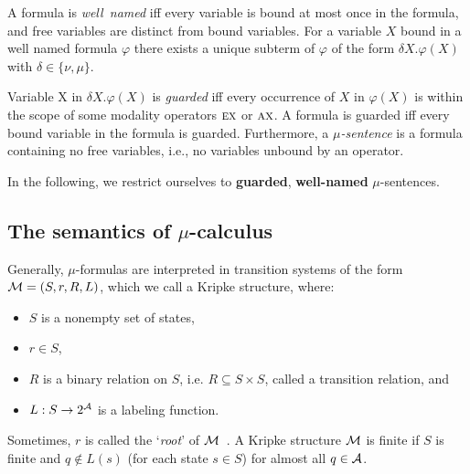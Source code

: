 \documentclass[runningheads]{llncs}
\begin{document}
A formula is \emph{well\ named} iff every variable is bound at most once in the formula, and free variables are distinct from bound
variables. For a variable $X$ bound in a well named formula $\varphi$ there exists a unique subterm of $\varphi$ of the form $\delta X. \varphi(X)$ with $\delta \in \{\nu, \mu\}$.

Variable X in $\delta X. \varphi(X)$ is \emph{guarded} iff every occurrence of $X$ in
$\varphi(X)$ is within the scope of some modality operators $\textsc{e} \textsc{x}$ or $\textsc{a} \textsc{x}$.
A formula is guarded iff every bound variable in the formula is guarded. Furthermore, a \emph{$\mu$-sentence} is a formula containing no free
variables, i.e., no variables unbound by an operator.

In the following, we restrict ourselves to \textbf{guarded}, \textbf{well-named} $\mu$-sentences.


\subsection{The semantics of $\mu$-calculus}\label{mu-semantic}
Generally, $\mu$-formulas are interpreted in transition systems of the form ${\cal M} = (S, r, R, L)$, which we call a Kripke structure, where:
\begin{itemize}
	\item $S$ is a nonempty set of states,
	\item $r\in S$,
	\item $R$ is a binary relation on $S$, i.e. $R \subseteq S \times S$, called a transition relation, and
	\item $L: S \rightarrow 2^{{\cal A}}$ is a labeling function.
\end{itemize}
Sometimes, $r$ is called the `\emph{root}' of ${\cal M}$~\cite{d2000logical}. A Kripke structure ${\cal M}$ is finite if $S$ is finite and $q \not \in L(s)$ (for each state $s\in S$) for  almost all $q\in {\cal A}$.
\end{document}
